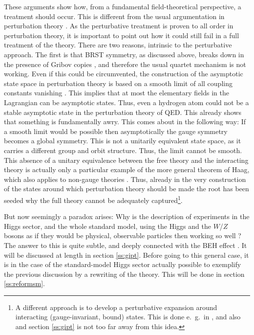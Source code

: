 \documentclass[final,twoside,12pt]{article}
\newcommand*{\1}{1\!\!\!\bot}
\begin{document}
These arguments show how, from a fundamental field-theoretical perspective, a treatment should occur. This is different from the usual argumentation in perturbation theory \cite{Bohm:2001yx}. As the perturbative treatment is proven to all order in perturbation theory, it is important to point out how it could still fail in a full treatment of the theory. There are two reasons, intrinsic to the perturbative approach. The first is that BRST symmetry, as discussed above, breaks down in the presence of Gribov copies \cite{Fujikawa:1982ss}, and therefore the usual quartet mechanism is not working. Even if this could be circumvented, the construction of the asymptotic state space in perturbation theory is based on a smooth limit of all coupling constants vanishing \cite{Bohm:2001yx}. This implies that at most the elementary fields in the Lagrangian can be asymptotic states. Thus, even a hydrogen atom could not be a stable asymptotic state in the perturbation theory of QED. This already shows that something is fundamentally awry. This comes about in the following way: If a smooth limit would be possible then asymptotically the gauge symmetry becomes a global symmetry. This is not a unitarily equivalent state space, as it carries a different group and orbit structure. Thus, the limit cannot be smooth. This absence of a unitary equivalence between the free theory and the interacting theory is actually only a particular example of the more general theorem of Haag, which also applies to non-gauge theories \cite{Haag:1992hx}. Thus, already in the very construction of the states around which perturbation theory should be made the root has been seeded why the full theory cannot be adequately captured\footnote{A different approach is to develop a perturbative expansion around interacting (gauge-invariant, bound) states. This is done e.\ g.\ in \cite{Hoyer:2014gna,Hoyer:2016orc,Attard:2017sdn}, and also \cite{Frohlich:1980gj,Frohlich:1981yi,Philipsen:1996af,Maas:2012tj} and section \ref{ss:gipt} is not too far away from this idea.}.

But now seemingly a paradox arises: Why is the description of experiments in the Higgs sector, and the whole standard model, using the Higgs and the $W$/$Z$ bosons as if they would be physical, observable particles then working so well \cite{Bohm:2001yx,pdg,Djouadi:2005gi,Dawson:2018dcd}? The answer to this is quite subtle, and deeply connected with the BEH effect \cite{Frohlich:1980gj,Frohlich:1981yi}. It will be discussed at length in section \ref{ss:gipt}. Before going to this general case, it is in the case of the standard-model Higgs sector actually possible to exemplify the previous discussion by a rewriting of the theory. This will be done in section \ref{ss:reformsm}.
\end{document}
